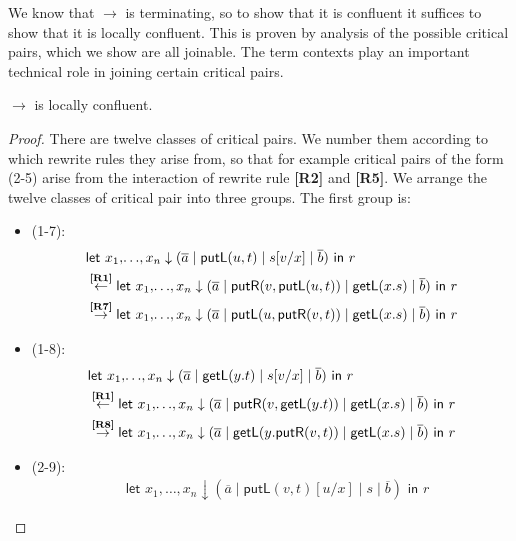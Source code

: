\documentclass[twoside,11pt,final]{entics}
\newcommand{\getl}{\mathsf{getL}}
\newcommand{\putr}{\mathsf{putR}}
\newcommand{\putl}{\mathsf{putL}}
\newcommand{\from}{\leftarrow}
\newcommand{\asn}{\downarrow}
\newcommand{\seq}{,\!\ldots\!,}
\begin{document}
We know that $\to$ is terminating, so to show that it is confluent it suffices to show that it is locally confluent. This is proven by analysis of the possible critical pairs, which we show are all joinable. The term contexts play an important technical role in joining certain critical pairs. 
\begin{lemma}\label{lem:local-confluence}
  $\to$ is locally confluent.
\end{lemma}
\begin{proof}
  There are twelve classes of critical pairs. We number them according to which rewrite rules they arise from, so that for example critical pairs of the form (2-5) arise from the interaction of rewrite rule \textbf{[R2]} and \textbf{[R5]}. We arrange the twelve classes of critical pair into three groups. The first group is:
  \begin{itemize}
  \item[] (1-7): \vspace{-2em}
    \begin{align*}
      & \textsf{let } x_1 \seq x_n \asn (\overline{a} \mid \putl(u,t) \mid s[v/x] \mid \overline{b}) \textsf{ in } r 
      \\& \overset{\text{{\bf [R1]}}}{\from} \textsf{let } x_1 \seq x_n \asn (\overline{a} \mid \putr(v,\putl(u,t)) \mid \getl(x.s) \mid \overline{b}) \textsf{ in } r
      \\& \overset{\text{\bf [R7]}}{\to} \textsf{let } x_1 \seq x_n \asn (\overline{a} \mid \putl(u,\putr(v,t)) \mid \getl(x.s) \mid \overline{b}) \textsf{ in } r 
    \end{align*}
  \item[] (1-8): \vspace{-2em}
    \begin{align*}
     & \textsf{let } x_1 \seq x_n \asn (\overline{a} \mid \getl(y.t) \mid s[v/x] \mid \overline{b}) \textsf{ in } r 
     \\& \overset{\text{\bf[R1]}}{\from} \textsf{let } x_1 \seq x_n \asn (\overline{a} \mid \putr(v,\getl(y.t)) \mid \getl(x.s) \mid \overline{b}) \textsf{ in }r
     \\&\overset{\text{\bf[R8]}}{\to} \textsf{let } x_1 \seq x_n \asn (\overline{a} \mid \getl(y.\putr(v,t)) \mid \getl(x.s) \mid \overline{b}) \textsf{ in } r 
    \end{align*}
  \item[] (2-9): \vspace{-2em}
    \begin{align*}
      &  \textsf{let } x_1 \seq x_n \asn (\overline{a} \mid \putl(v,t)[u/x] \mid s \mid \overline{b}) \textsf{ in } r 

\end{align*}
\end{itemize}
\end{proof}
\end{document}
